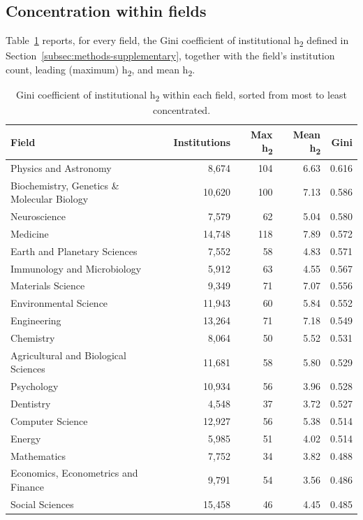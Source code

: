 \subsection{Concentration within fields}
\label{subsec:gini}
Table~\ref{tab:gini} reports, for every field, the Gini coefficient of institutional h\textsubscript{2} defined in Section~\ref{subsec:methods-supplementary}, together with the field's institution count, leading (maximum) h\textsubscript{2}, and mean h\textsubscript{2}.

\begin{table}[h]
	\centering
	\small
	\caption{Gini coefficient of institutional h\textsubscript{2} within each field, sorted from most to least concentrated.}
	\label{tab:gini}
	\begin{tabular}{@{}lrrrr@{}}
	\toprule
	Field & Institutions & Max h\textsubscript{2} & Mean h\textsubscript{2} & Gini \\
	\midrule
	Physics and Astronomy & 8,674 & 104 & 6.63 & 0.616 \\
	Biochemistry, Genetics \& Molecular Biology & 10,620 & 100 & 7.13 & 0.586 \\
	Neuroscience & 7,579 & 62 & 5.04 & 0.580 \\
	Medicine & 14,748 & 118 & 7.89 & 0.572 \\
	Earth and Planetary Sciences & 7,552 & 58 & 4.83 & 0.571 \\
	Immunology and Microbiology & 5,912 & 63 & 4.55 & 0.567 \\
	Materials Science & 9,349 & 71 & 7.07 & 0.556 \\
	Environmental Science & 11,943 & 60 & 5.84 & 0.552 \\
	Engineering & 13,264 & 71 & 7.18 & 0.549 \\
	Chemistry & 8,064 & 50 & 5.52 & 0.531 \\
	Agricultural and Biological Sciences & 11,681 & 58 & 5.80 & 0.529 \\
	Psychology & 10,934 & 56 & 3.96 & 0.528 \\
	Dentistry & 4,548 & 37 & 3.72 & 0.527 \\
	Computer Science & 12,927 & 56 & 5.38 & 0.514 \\
	Energy & 5,985 & 51 & 4.02 & 0.514 \\
	Mathematics & 7,752 & 34 & 3.82 & 0.488 \\
	Economics, Econometrics and Finance & 9,791 & 54 & 3.56 & 0.486 \\
	Social Sciences & 15,458 & 46 & 4.45 & 0.485 \\

\end{tabular}
\end{table}
